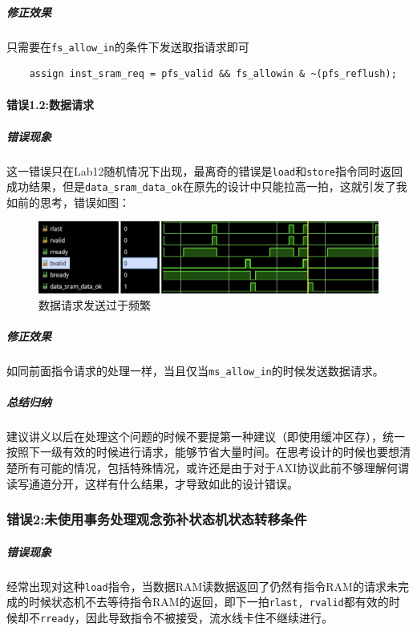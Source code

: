 \documentclass[UTF-8,twoside,c5size]{ctexart}
\begin{document}
	\subparagraph{修正效果}\hfill
	
	只需要在\texttt{fs_allow_in}的条件下发送取指请求即可
	
    \begin{verbatim}
    assign inst_sram_req = pfs_valid && fs_allowin & ~(pfs_reflush);
    \end{verbatim}
	
	\paragraph{错误\textbf{1.2:}数据请求}\hfill
	
	\subparagraph{错误现象}\hfill
	
	这一错误只在Lab12随机情况下出现，最离奇的错误是\texttt{load}和\texttt{store}指令同时返回成功结果，但是\texttt{data_sram_data_ok}在原先的设计中只能拉高一拍，这就引发了我如前的思考，错误如图：
	
	\begin{figure}[h]
		\centering
		\includegraphics[width=0.8\linewidth]{data_req_frequently.png}
		\caption[data_req_frequently]{数据请求发送过于频繁}
		\label{fig:data_req_frequently}
	\end{figure}

	\subparagraph{修正效果}\hfill
	
	如同前面指令请求的处理一样，当且仅当\texttt{ms_allow_in}的时候发送数据请求。
	
	\subparagraph{总结归纳}\hfill
	
	建议讲义以后在处理这个问题的时候不要提第一种建议（即使用缓冲区存），统一按照下一级有效的时候进行请求，能够节省大量时间。在思考设计的时候也要想清楚所有可能的情况，包括特殊情况，或许还是由于对于AXI协议此前不够理解何谓读写通道分开，这样有什么结果，才导致如此的设计错误。
	
	\subsubsection{错误\textbf{2:}未使用事务处理观念弥补状态机状态转移条件}
	\label{business}
	
	\subparagraph{错误现象}\hfill
	
	经常出现对这种\texttt{load}指令，当数据RAM读数据返回了仍然有指令RAM的请求未完成的时候状态机不去等待指令RAM的返回，即下一拍\texttt{rlast, rvalid}都有效的时候却不\texttt{rready}，因此导致指令不被接受，流水线卡住不继续进行。
	
\end{document}
